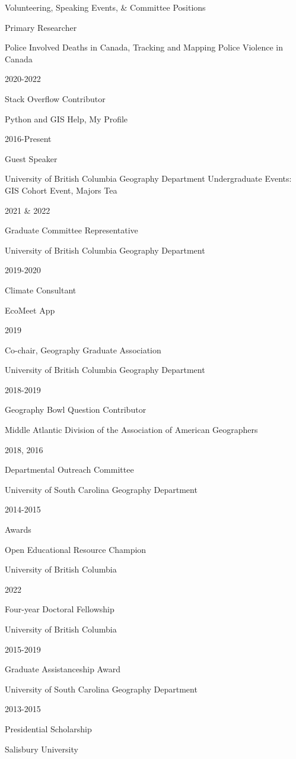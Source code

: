 \documentclass[
]{article}
\begin{document}
Volunteering, Speaking Events, \& Committee Positions

Primary Researcher

Police Involved Deaths in Canada, Tracking and Mapping Police Violence
in Canada

2020-2022

Stack Overflow Contributor

Python and GIS Help, My Profile

2016-Present

Guest Speaker

University of British Columbia Geography Department Undergraduate
Events: GIS Cohort Event, Majors Tea

2021 \& 2022

Graduate Committee Representative

University of British Columbia Geography Department

2019-2020

Climate Consultant

EcoMeet App

2019

Co-chair, Geography Graduate Association

University of British Columbia Geography Department

2018-2019

Geography Bowl Question Contributor

Middle Atlantic Division of the Association of American Geographers

2018, 2016

Departmental Outreach Committee

University of South Carolina Geography Department

2014-2015

Awards

Open Educational Resource Champion

University of British Columbia

2022

Four-year Doctoral Fellowship

University of British Columbia

2015-2019

Graduate Assistanceship Award

University of South Carolina Geography Department

2013-2015

Presidential Scholarship

Salisbury University
\end{document}

